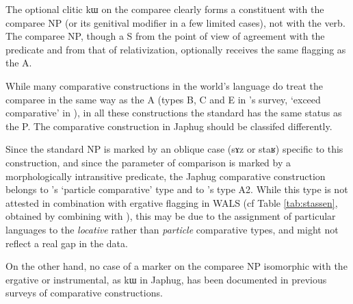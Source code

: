 \documentclass[oldfontcommands,oneside,a4paper,11pt]{article}
\newcommand{\ipa}[1]{{\phon #1}} %
\begin{document}
The optional clitic \ipa{kɯ} on the comparee  clearly forms a constituent with the comparee NP (or its genitival modifier in a few limited cases), not with the verb. The comparee NP, though a S from the point of view of agreement with the predicate and from that of relativization, optionally receives  the same flagging as the A.

 
While many comparative constructions in the world's language do treat the comparee in the same way as the A (types B, C and E in \citealt[789]{dixon08comparative}'s survey, `exceed comparative' in  \citealt{stassen11comparative}), in all these constructions the standard has the same status as the P.  The comparative construction in Japhug should be classifed differently. 

Since the standard NP is marked by an oblique case (\ipa{sɤz} or \ipa{staʁ}) specific to this construction, and since the parameter of comparison is marked by a morphologically intransitive predicate, the Japhug comparative construction belongs to  \citet{stassen11comparative}'s `particle comparative' type and to \citet[789]{dixon08comparative}'s type A2.  While this type is not attested in combination with  ergative flagging in WALS (cf Table \ref{tab:stassen}, obtained by combining \citealt{stassen11comparative} with \citealt{comrie11case}), this may be due to the assignment of particular languages to the \textit{locative} rather than \textit{particle}  comparative types, and might not reflect a real gap in the data.

On the other hand, no case of a marker   on the comparee NP isomorphic with the ergative or instrumental, as \ipa{kɯ} in Japhug, has been documented in   previous surveys of comparative constructions.

\begin{table}[h]
\caption{Combination of chapters 98 (Alignment of Case Marking of Full Nouns) and 121 (Comparative constructions) of the WALS} \label{tab:stassen}
\end{table}
 
\end{document}
